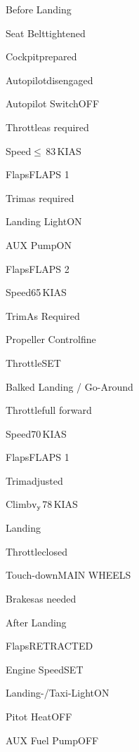 \begin{checklist}{Before Landing}
  \item{Seat Belt}{tightened}
  \item{Cockpit}{prepared}
  \item{Autopilot}{disengaged}
  \item{Autopilot Switch}{OFF}
  \item{Throttle}{as required}
  \item{Speed}{${\leq}$\,83\,KIAS}
  \item{Flaps}{FLAPS 1}
  \item{Trim}{as required}
  \item{Landing Light}{ON}
  \item{AUX Pump}{ON}
  \item{Flaps}{FLAPS 2}
  \item{Speed}{65\,KIAS}
  \item{Trim}{As Required}
  \item{Propeller Control}{fine}
  \item{Throttle}{SET}
\end{checklist}

\begin{checklist}{Balked Landing / Go-Around}
  \item{Throttle}{full forward}
  \item{Speed}{70\,KIAS}
  \item{Flaps}{FLAPS 1}
  \item{Trim}{adjusted}
  \item{Climb}{$\mathrm{\lowercase{v}}_{\mathrm{\lowercase{y}}}$78\,KIAS} 
\end{checklist}

\begin{checklist}{Landing}
  \item{Throttle}{closed}
  \item{Touch-down}{MAIN WHEELS}
  \item{Brakes}{as needed}
\end{checklist}

\begin{checklist}{After Landing}
  \item{Flaps}{RETRACTED}
  \item{Engine Speed}{SET}
  \item{Landing-/Taxi-Light}{ON}
  \item{Pitot Heat}{OFF}
  \item{AUX Fuel Pump}{OFF}
\end{checklist}

